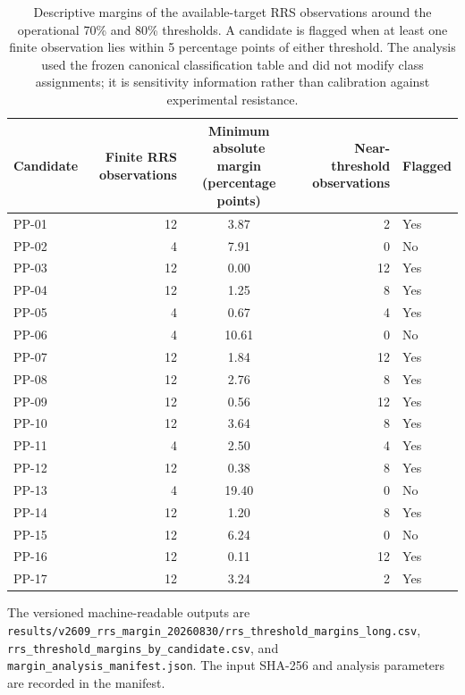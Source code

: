\begin{table}[htbp]
\centering
\scriptsize
\caption{Descriptive margins of the available-target RRS observations around the operational 70\% and 80\% thresholds. A candidate is flagged when at least one finite observation lies within 5 percentage points of either threshold. The analysis used the frozen canonical classification table and did not modify class assignments; it is sensitivity information rather than calibration against experimental resistance.}
\label{tab:s18_rrs_margin_sensitivity}
\begin{tabularx}{\textwidth}{l r S[table-format=2.2] r l}
\toprule
Candidate & {Finite RRS observations} & {Minimum absolute margin (percentage points)} & {Near-threshold observations} & {Flagged} \\
\midrule
PP-01 & 12 & 3.87 & 2 & Yes \\
PP-02 & 4 & 7.91 & 0 & No \\
PP-03 & 12 & 0.00 & 12 & Yes \\
PP-04 & 12 & 1.25 & 8 & Yes \\
PP-05 & 4 & 0.67 & 4 & Yes \\
PP-06 & 4 & 10.61 & 0 & No \\
PP-07 & 12 & 1.84 & 12 & Yes \\
PP-08 & 12 & 2.76 & 8 & Yes \\
PP-09 & 12 & 0.56 & 12 & Yes \\
PP-10 & 12 & 3.64 & 8 & Yes \\
PP-11 & 4 & 2.50 & 4 & Yes \\
PP-12 & 12 & 0.38 & 8 & Yes \\
PP-13 & 4 & 19.40 & 0 & No \\
PP-14 & 12 & 1.20 & 8 & Yes \\
PP-15 & 12 & 6.24 & 0 & No \\
PP-16 & 12 & 0.11 & 12 & Yes \\
PP-17 & 12 & 3.24 & 2 & Yes \\
\bottomrule
\end{tabularx}
\end{table}

\noindent The versioned machine-readable outputs are \texttt{results/v2609\_rrs\_margin\_20260830/rrs\_threshold\_margins\_long.csv}, \texttt{rrs\_threshold\_margins\_by\_candidate.csv}, and \texttt{margin\_analysis\_manifest.json}. The input SHA-256 and analysis parameters are recorded in the manifest.
